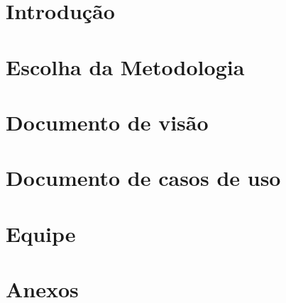 \section{Introdução} %
\label{sec:introdu_o}
 

\section{Escolha da Metodologia} %
\label{sec:metodologia}
 

\section{Documento de visão}
\label{sec:document_de_visao}


\section{Documento de casos de uso}
\label{sec:documento_de_caso_de_uso}


\section{Equipe} %
\label{sec:equipe}


\section{Anexos}
\label{sec:anexos}


%

%
